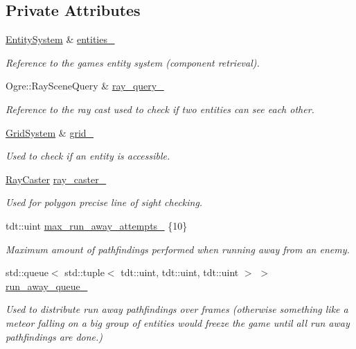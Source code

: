 \subsection*{Private Attributes}
\begin{DoxyCompactItemize}
\item 
\hyperlink{class_entity_system}{Entity\+System} \& \hyperlink{class_combat_system_a801a051bdd230885b786fcc7b2dad9af}{entities\+\_\+}
\begin{DoxyCompactList}\small\item\em Reference to the game\textquotesingle{}s entity system (component retrieval). \end{DoxyCompactList}\item 
Ogre\+::\+Ray\+Scene\+Query \& \hyperlink{class_combat_system_a03b947e997e7138738daf26f48eac7dd}{ray\+\_\+query\+\_\+}
\begin{DoxyCompactList}\small\item\em Reference to the ray cast used to check if two entities can see each other. \end{DoxyCompactList}\item 
\hyperlink{class_grid_system}{Grid\+System} \& \hyperlink{class_combat_system_a90e8e6bb234cb358f676101f8da2daaf}{grid\+\_\+}
\begin{DoxyCompactList}\small\item\em Used to check if an entity is accessible. \end{DoxyCompactList}\item 
\hyperlink{class_ray_caster}{Ray\+Caster} \hyperlink{class_combat_system_aefac99884a4c7fa895f09dd484a3bd15}{ray\+\_\+caster\+\_\+}
\begin{DoxyCompactList}\small\item\em Used for polygon precise line of sight checking. \end{DoxyCompactList}\item 
tdt\+::uint \hyperlink{class_combat_system_a1b68f04d3aee2673466cc57701d8e2e1}{max\+\_\+run\+\_\+away\+\_\+attempts\+\_\+} \{10\}
\begin{DoxyCompactList}\small\item\em Maximum amount of pathfindings performed when running away from an enemy. \end{DoxyCompactList}\item 
std\+::queue$<$ std\+::tuple$<$ tdt\+::uint, tdt\+::uint, tdt\+::uint $>$ $>$ \hyperlink{class_combat_system_aafe37a8f7fa29174c136c747a3d7ee54}{run\+\_\+away\+\_\+queue\+\_\+}
\begin{DoxyCompactList}\small\item\em Used to distribute run away pathfindings over frames (otherwise something like a meteor falling on a big group of entities would freeze the game until all run away pathfindings are done.) \end{DoxyCompactList}\end{DoxyCompactItemize}


